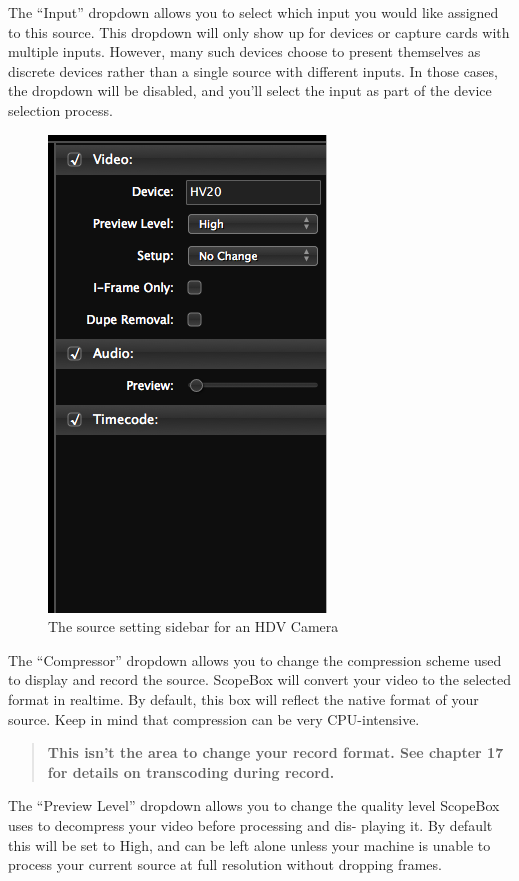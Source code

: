 \documentclass[10,letterpaper,]{report}
\begin{document}
The ``Input'' dropdown allows you to select which input you would like
assigned to this source. This dropdown will only show up for devices or
capture cards with multiple inputs. However, many such devices choose to
present themselves as discrete devices rather than a single source with
different inputs. In those cases, the dropdown will be disabled, and
you'll select the input as part of the device selection process.

\begin{figure}[htbp]
\centering
\includegraphics{images/SourceSidebar.png}
\caption{The source setting sidebar for an HDV Camera}
\end{figure}

The ``Compressor'' dropdown allows you to change the compression scheme
used to display and record the source. ScopeBox will convert your video
to the selected format in realtime. By default, this box will reflect
the native format of your source. Keep in mind that compression can be
very CPU-intensive.

\begin{quote}
\textbf{This isn't the area to change your record format. See chapter 17
for details on transcoding during record.}
\end{quote}

The ``Preview Level'' dropdown allows you to change the quality level
ScopeBox uses to decompress your video before processing and dis-
playing it. By default this will be set to High, and can be left alone
unless your machine is unable to process your current source at full
resolution without dropping frames.
\end{document}
